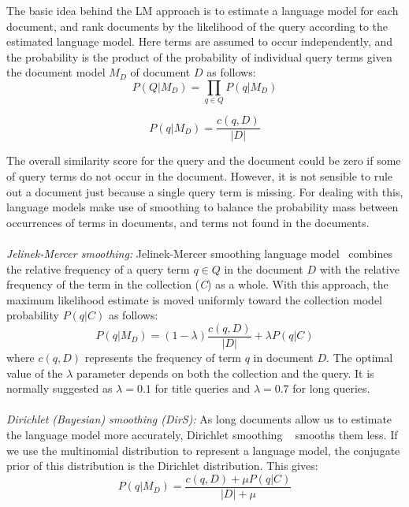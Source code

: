 The basic idea behind the LM approach is to estimate a language model for each document, and rank documents by the likelihood of the query according to the estimated language model. Here terms are assumed to occur independently, and the probability is the product of the probability of individual query terms given the document model $ M_{D} $ of document $ D $ as follows:
\begin{equation}
\label{eq:multinomial}
 P(Q|M_{D}) = \prod\limits_{q\in Q} P(q|M_{D}) 
\end{equation}

\begin{equation}
\label{eq:multinomial}
 P(q|M_{D}) = \frac{c(q,D)}{|D|}
\end{equation}

The overall similarity score for the query and the document could be zero if some of query terms do not occur in the document. However, it is not sensible to rule out a document just because a single query term is missing. For dealing with this, language models make use of smoothing to balance the probability mass between occurrences of terms in documents, and terms not found in the documents.
\\\\
\textit{Jelinek-Mercer smoothing:} Jelinek-Mercer smoothing language model~\citep{zhai2004study} combines the relative frequency of a query term $ q\in Q $ in the document $ D $ with the relative frequency of the term in the collection (\textit{C}) as a whole. With this approach, the maximum likelihood estimate is moved uniformly toward the collection model probability $ P(q|C) $ as follows:
\begin{equation}
P(q|M_{D}) = (1-\lambda)\frac{c(q,D)}{|D|}+\lambda P(q|C) 
\label{eq:jmsmoothing}
\end{equation} 
where $ c(q,D) $ represents the frequency of term $ q $ in document $ D $. The optimal value of the $ \lambda $ parameter depends on both the collection and the query. It is normally suggested as $ \lambda = 0.1$ for title queries and $ \lambda = 0.7$ for long queries.
\\\\
\textit{Dirichlet (Bayesian) smoothing (DirS):} As long documents allow us to estimate the language model more accurately, Dirichlet smoothing ~\citep{zhai2004study} smooths them less. If we use the multinomial distribution to represent a language model, the conjugate prior of this distribution is the Dirichlet distribution. This gives:
\begin{equation}
\label{eq:bayessmoothing}
 P(q|M_{D}) = \frac{c(q,D) + \mu P(q|C)}{|D| + \mu}
\end{equation} 


